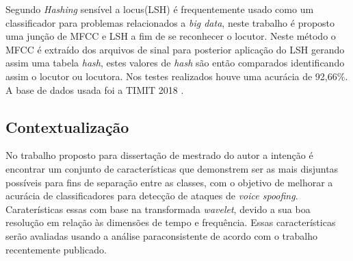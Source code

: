 \begin{myenv}{1.5}
		\par Segundo \cite{8396208} \textit{Hashing} sensível a locus(LSH) é frequentemente usado como um classificador para problemas relacionados a \textit{big data}, neste trabalho é proposto uma junção de MFCC e LSH a fim de se reconhecer o locutor. Neste método o MFCC é extraído dos arquivos de sinal para posterior aplicação do LSH gerando assim uma tabela \textit{hash}, estes valores de \textit{hash} são então comparados identificando assim o locutor ou locutora. Nos testes realizados houve uma acurácia de 92,66\%. A base de dados usada foi a TIMIT 2018 \cite{TIMIT2018}. 

		\subsection{Contextualização}
		\par No trabalho proposto para dissertação de mestrado do autor a intenção é encontrar um conjunto de características que demonstrem ser as mais disjuntas possíveis para fins de separação entre as classes, com o objetivo de melhorar a acurácia de classificadores para detecção de ataques de \textit{voice spoofing}. Caraterísticas essas com base na transformada \textit{wavelet}, devido a sua boa resolução em relação às dimensões de tempo e frequência. Essas características serão avaliadas usando a análise paraconsistente de acordo com o trabalho \cite{8588433} recentemente publicado.

	\end{myenv}